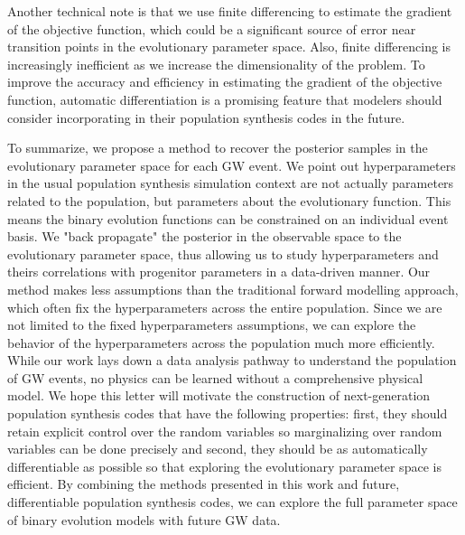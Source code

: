 \documentclass[twocolumn]{aastex631}
\begin{document}
Another technical note is that we use finite differencing to estimate the
gradient of the objective function, which could be a significant source of error
near transition points in the evolutionary parameter space. Also, finite
differencing is increasingly inefficient as we increase the dimensionality of
the problem. To improve the accuracy and efficiency in estimating the gradient
of the objective function, automatic differentiation is a promising feature that
modelers should consider incorporating in their population synthesis codes in
the future.


To summarize, we propose a method to recover the posterior samples in the evolutionary parameter space for each GW event.
We point out hyperparameters in the usual population synthesis simulation context are not actually parameters related to the population,
but parameters about the evolutionary function.
This means the binary evolution functions can be constrained on an individual event basis.
We "back propagate" the posterior in the observable space to the evolutionary parameter space,
thus allowing us to study hyperparameters and theirs correlations with progenitor parameters in a data-driven manner.
Our method makes less assumptions than the traditional forward modelling approach,
which often fix the hyperparameters across the entire population.
Since we are not limited to the fixed hyperparameters assumptions, we can explore the behavior of the hyperparameters across the population much more efficiently.
While our work lays down a data analysis pathway to understand the population of GW events,
no physics can be learned without a comprehensive physical model.
We hope this letter will motivate the construction of next-generation population synthesis codes that have the following properties:
first, they should retain explicit control over the random variables so marginalizing over random variables can be done precisely and
second, they should be as automatically differentiable as possible so that exploring the evolutionary parameter space is efficient.
By combining the methods presented in this work and future, differentiable population synthesis codes,
we can explore the full parameter space of binary evolution models with future GW data.
\end{document}
